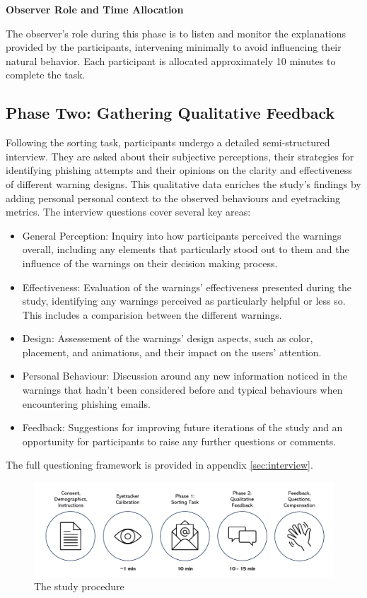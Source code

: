 \documentclass[
  a4paper,  %
  twoside,  %
  bibliography=totoc,
  headsepline,
  cleardoublepage=empty,
  parskip=half,
  draft=false
]{scrbook}
\begin{document}
\textbf{Observer Role and Time Allocation}

The observer's role during this phase is to listen and monitor the explanations provided by the participants, intervening minimally to avoid influencing their natural behavior. Each participant is allocated approximately 10 minutes to complete the task.

\subsection{Phase Two: Gathering Qualitative Feedback}

Following the sorting task, participants undergo a detailed semi-structured interview. They are asked about their subjective perceptions, their strategies for identifying phishing attempts and their opinions on the clarity and effectiveness of different warning designs.
This qualitative data enriches the study’s findings by adding personal personal context to the observed behaviours and eyetracking metrics. The interview questions cover several key areas:

\begin{itemize}
    \item General Perception: Inquiry into how participants perceived the warnings overall, including any elements that particularly stood out to them and the influence of the warnings on their decision making process.
    \item Effectiveness: Evaluation of the warnings' effectiveness presented during the study, identifying any warnings perceived as particularly helpful or less so. This includes a comparision between the different warnings.
    \item Design: Assessement of the warnings' design aspects, such as color, placement, and animations, and their impact on the users' attention.
    \item Personal Behaviour: Discussion around any new information noticed in the warnings that hadn't been considered before and typical behaviours when encountering phishing emails.
    \item Feedback: Suggestions for improving future iterations of the study and an opportunity for participants to raise any further questions or comments. 
\end{itemize}
 
The full questioning framework is provided in appendix \ref{sec:interview}.

\begin{figure} [ht]
    \centering
    \includegraphics[width=1\linewidth]{figures/studysteps.png}
    \caption{The study procedure}
    \label{fig:steps}
\end{figure}
\end{document}
